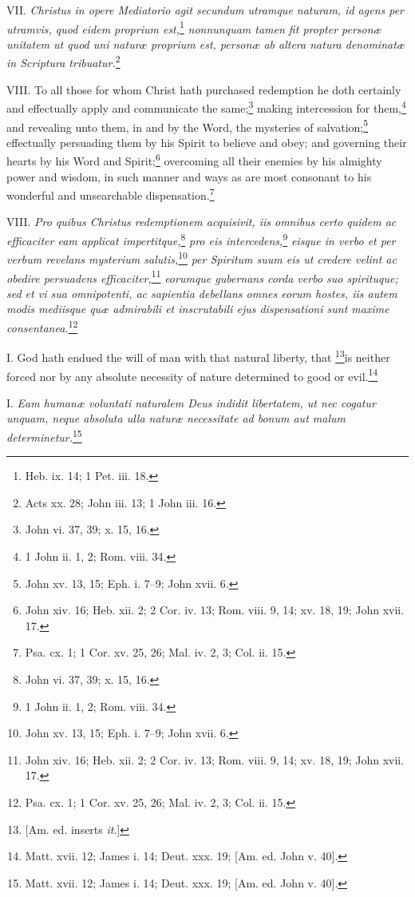 VII. \emph{Christus in opere Mediatorio agit secundum utramque naturam, id agens per utramvis, quod eidem proprium est,}\footnote{Heb. ix. 14; 1 Pet. iii. 18.}\emph{ nonnunquam tamen fit propter personæ unitatem ut quod uni naturæ proprium est, personæ ab altera natura denominatæ in Scriptura tribuatur.}\footnote{Acts xx. 28; John iii. 13; 1 John iii. 16.}

VIII. To all those for whom Christ hath purchased redemption he doth certainly and effectually apply and communicate the same;\footnote{John vi. 37, 39; x. 15, 16.} making intercession for them,\footnote{1 John ii. 1, 2; Rom. viii. 34.} and revealing unto them, in and by the Word, the mysteries of salvation;\footnote{John xv. 13, 15; Eph. i. 7–9; John xvii. 6.} effectually persuading them by his Spirit to believe and obey; and governing their hearts by his Word and Spirit;\footnote{John xiv. 16; Heb. xii. 2; 2 Cor. iv. 13; Rom. viii. 9, 14; xv. 18, 19; John xvii. 17.} overcoming all their enemies by his almighty power and wisdom, in such manner and ways as are most consonant to his wonderful and unsearchable dispensation.\footnote{Psa. cx. 1; 1 Cor. xv. 25, 26; Mal. iv. 2, 3; Col. ii. 15.}

VIII. \emph{Pro quibus Christus redemptionem acquisivit, iis omnibus certo quidem ac efficaciter eam applicat impertitque,}\footnote{John vi. 37, 39; x. 15, 16.}\emph{ pro eis intercedens,}\footnote{1 John ii. 1, 2; Rom. viii. 34.}\emph{ eisque in verbo et per verbum revelans mysterium salutis,}\footnote{John xv. 13, 15; Eph. i. 7–9; John xvii. 6.}\emph{ per Spiritum suum eis ut credere velint ac obedire persuadens efficaciter,}\footnote{John xiv. 16; Heb. xii. 2; 2 Cor. iv. 13; Rom. viii. 9, 14; xv. 18, 19; John xvii. 17.}\emph{ eorumque gubernans corda verbo suo spirituque; sed et vi sua omnipotenti, ac sapientia debellans omnes eorum hostes, iis autem modis mediisque quæ admirabili et inscrutabili ejus dispensationi sunt maxime consentanea.}\footnote{Psa. cx. 1; 1 Cor. xv. 25, 26; Mal. iv. 2, 3; Col. ii. 15.}


I. God hath endued the will of man with that natural liberty, that \footnote{[Am. ed. inserts \emph{it}.]}is neither forced nor by any absolute necessity of nature determined to good or evil.\footnote{Matt. xvii. 12; James i. 14; Deut. xxx. 19; [Am. ed. John v. 40].}

I. \emph{Eam humanæ voluntati naturalem Deus indidit libertatem, ut nec cogatur unquam, neque absoluta ulla naturæ necessitate ad bonum aut malum determinetur.}\footnote{Matt. xvii. 12; James i. 14; Deut. xxx. 19; [Am. ed. John v. 40].}

